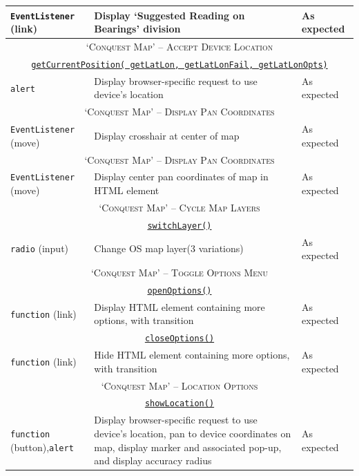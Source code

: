 \documentclass[11pt, english]{article}
\begin{document}
\begin{center}
\begin{longtable}{p{3cm}p{8cm}p{2cm}}
		\texttt{EventListener} (link) & Display `Suggested Reading on Bearings' division & As expected\\
		\hline
		\multicolumn{3}{c}{\textsc{`Conquest Map' -- Accept Device Location}}\\
		\hline
		\multicolumn{3}{c}{\underline{\texttt{getCurrentPosition( getLatLon, getLatLonFail, getLatLonOpts)}}}\\
		\texttt{alert} & Display browser-specific request to use device's location & As expected\\
		\hline
		\multicolumn{3}{c}{\textsc{`Conquest Map' -- Display Pan Coordinates}}\\
		\hline
		\texttt{EventListener} (move) & Display crosshair at center of map & As expected\\
		\hline
		\multicolumn{3}{c}{\textsc{`Conquest Map' -- Display Pan Coordinates}}\\
		\hline
		\texttt{EventListener} (move) & Display center pan coordinates of map in HTML element & As expected\\
		\hline
		\multicolumn{3}{c}{\textsc{`Conquest Map' -- Cycle Map Layers}}\\
		\hline
		\multicolumn{3}{c}{\underline{\texttt{switchLayer()}}}\\
		\texttt{radio} (input) & Change OS map layer\newline (3 variations) & As expected\\
		\hline
		\multicolumn{3}{c}{\textsc{`Conquest Map' -- Toggle Options Menu}}\\
		\hline
		\multicolumn{3}{c}{\underline{\texttt{openOptions()}}}\\
		\texttt{function} (link) & Display HTML element containing more options, with transition & As expected\\
		\multicolumn{3}{c}{\underline{\texttt{closeOptions()}}}\\
		\texttt{function} (link) & Hide HTML element containing more options, with transition & As expected\\
		\hline
		\multicolumn{3}{c}{\textsc{`Conquest Map' -- Location Options}}\\
		\hline
		\multicolumn{3}{c}{\underline{\texttt{showLocation()}}}\\
		\texttt{function} (button),\newline \texttt{alert} & Display browser-specific request to use device's location, pan to device coordinates on map, display marker and associated pop-up, and display accuracy radius & As expected\\

\end{longtable}
\end{center}
\end{document}
